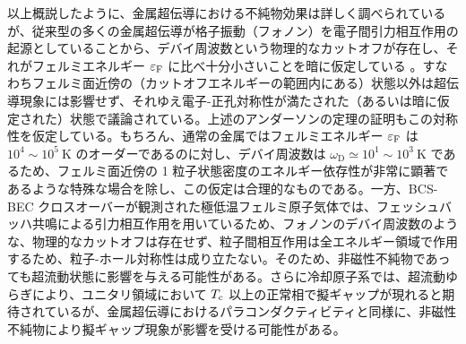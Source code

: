 以上概説したように、金属超伝導における不純物効果は詳しく調べられているが、従来型の多くの金属超伝導が格子振動（フォノン）を電子間引力相互作用の起源としていることから、デバイ周波数という物理的なカットオフが存在し、それがフェルミエネルギー $\varepsilon_{\text{F}}$ に比べ十分小さいことを暗に仮定している \cite{maki1968}。すなわちフェルミ面近傍の（カットオフエネルギーの範囲内にある）状態以外は超伝導現象には影響せず、それゆえ電子-正孔対称性が満たされた（あるいは暗に仮定された）状態で議論されている。上述のアンダーソンの定理の証明もこの対称性を仮定している。もちろん、通常の金属ではフェルミエネルギー $\varepsilon_{\text{F}}$ は $10^{4} \sim 10^{5}\ \mathrm{K}$ のオーダーであるのに対し、デバイ周波数は $\omega_{\text{D}} \simeq 10^{1}\sim 10^{3}\ \mathrm{K}$ であるため、フェルミ面近傍の 1 粒子状態密度のエネルギー依存性が非常に顕著であるような特殊な場合を除し、この仮定は合理的なものである。一方、BCS-BEC クロスオーバーが観測された極低温フェルミ原子気体では、フェッシュバッハ共鳴による引力相互作用を用いているため、フォノンのデバイ周波数のような、物理的なカットオフは存在せず、粒子間相互作用は全エネルギー領域で作用するため、粒子-ホール対称性は成り立たない。そのため、非磁性不純物であっても超流動状態に影響を与える可能性がある。さらに冷却原子系では、超流動ゆらぎにより、ユニタリ領域において $T_{\text{c}}$ 以上の正常相で擬ギャップが現れると期待されているが、金属超伝導におけるパラコンダクティビティと同様に、非磁性不純物により擬ギャップ現象が影響を受ける可能性がある。



